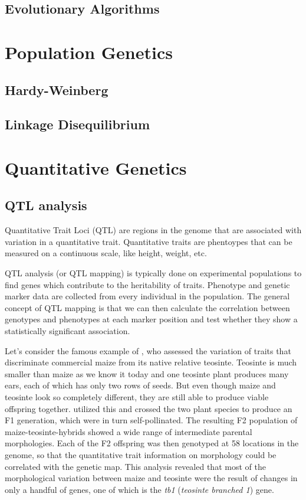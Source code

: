 \documentclass[12pt,]{krantz}
\begin{document}
\section{Evolutionary Algorithms}\label{evolutionary-algorithms}

\chapter{Population Genetics}\label{population-genetics}

\section{Hardy-Weinberg}\label{hardy-weinberg}

\section{Linkage Disequilibrium}\label{linkage-disequilibrium}

\chapter{Quantitative Genetics}\label{quantitative-genetics}

\section{QTL analysis}\label{qtl-analysis}

Quantitative Trait Loci (QTL) are regions in the genome that are
associated with variation in a quantitative trait. Quantitative traits
are phentoypes that can be measured on a continuous scale, like height,
weight, etc.

QTL analysis (or QTL mapping) is typically done on experimental
populations to find genes which contribute to the heritability of
traits. Phenotype and genetic marker data are collected from every
individual in the population. The general concept of QTL mapping is that
we can then calculate the correlation between genotypes and phenotypes
at each marker position and test whether they show a statistically
significant association.

Let's consider the famous example of \citet{Doebley285}, who assessed
the variation of traits that discriminate commercial maize from its
native relative teosinte. Teosinte is much smaller than maize as we know
it today and one teosinte plant produces many ears, each of which has
only two rows of seeds. But even though maize and teosinte look so
completely different, they are still able to produce viable offspring
together. \citet{Doebley285} utilized this and crossed the two plant
species to produce an F1 generation, which were in turn self-pollinated.
The resulting F2 population of maize-teosinte-hybrids showed a wide
range of intermediate parental morphologies. Each of the F2 offspring
was then genotyped at 58 locations in the genome, so that the
quantitative trait information on morphology could be correlated with
the genetic map. This analysis revealed that most of the morphological
variation between maize and teosinte were the result of changes in only
a handful of genes, one of which is the \emph{tb1} (\emph{teosinte
branched 1}) gene.
\end{document}
